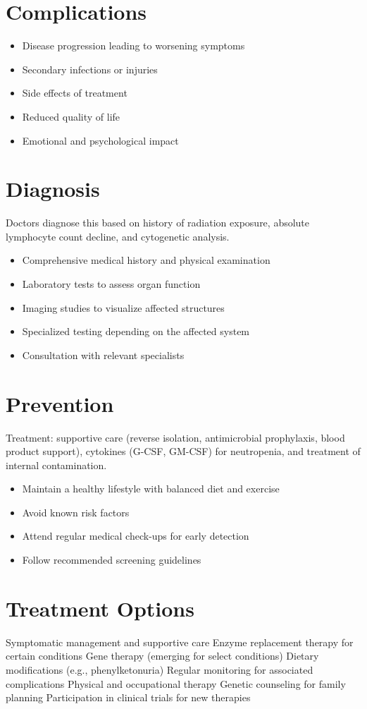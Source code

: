 \section{Complications}
\begin{itemize}[noitemsep]
  \item Disease progression leading to worsening symptoms
  \item Secondary infections or injuries
  \item Side effects of treatment
  \item Reduced quality of life
  \item Emotional and psychological impact
\end{itemize}
\section{Diagnosis}
Doctors diagnose this based on history of radiation exposure, absolute lymphocyte count decline, and cytogenetic analysis.

\begin{itemize}[noitemsep]
  \item Comprehensive medical history and physical examination
  \item Laboratory tests to assess organ function
  \item Imaging studies to visualize affected structures
  \item Specialized testing depending on the affected system
  \item Consultation with relevant specialists
\end{itemize}
\section{Prevention}
Treatment: supportive care (reverse isolation, antimicrobial prophylaxis, blood product support), cytokines (G-CSF, GM-CSF) for neutropenia, and treatment of internal contamination.

\begin{itemize}[noitemsep]
  \item Maintain a healthy lifestyle with balanced diet and exercise
  \item Avoid known risk factors
  \item Attend regular medical check-ups for early detection
  \item Follow recommended screening guidelines
\end{itemize}
\section{Treatment Options}
Symptomatic management and supportive care Enzyme replacement therapy for certain conditions Gene therapy (emerging for select conditions) Dietary modifications (e.g., phenylketonuria) Regular monitoring for associated complications Physical and occupational therapy Genetic counseling for family planning Participation in clinical trials for new therapies

